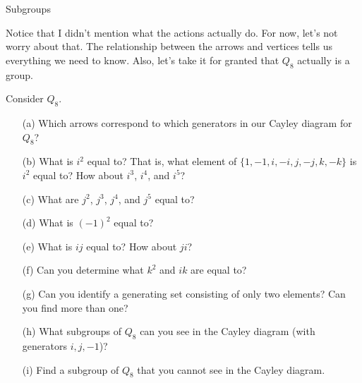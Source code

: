 \begin{section}{Subgroups}
\begin{center}
\end{center}

Notice that I didn't mention what the actions actually do.  For now, let's not worry about that.  The relationship between the arrows and vertices tells us everything we need to know.  Also, let's take it for granted that \(Q_8\) actually is a group.

\begin{exercise}
Consider \(Q_8\).
\begin{enumerate}
\item[(a)] Which arrows correspond to which generators in our Cayley diagram for \(Q_8\)?
\item[(b)] What is \(i^2\) equal to?  That is, what element of \(\{1,-1,i,-i,j,-j,k,-k\}\) is \(i^2\) equal to?  How about \(i^3\), \(i^4\), and \(i^5\)?
\item[(c)] What are \(j^2\), \(j^3\), \(j^4\), and \(j^5\) equal to?
\item[(d)] What is \((-1)^2\) equal to?
\item[(e)] What is \(ij\) equal to?  How about \(ji\)?
\item[(f)] Can you determine what \(k^2\) and \(ik\) are equal to?
\item[(g)] Can you identify a generating set consisting of only two elements?  Can you find more than one?
\item[(h)] What subgroups of \(Q_8\) can you see in the Cayley diagram (with generators \(i, j, -1\))?
\item[(i)] Find a subgroup of \(Q_8\) that you cannot see in the Cayley diagram.
\end{enumerate}
\end{exercise}

\end{section}

